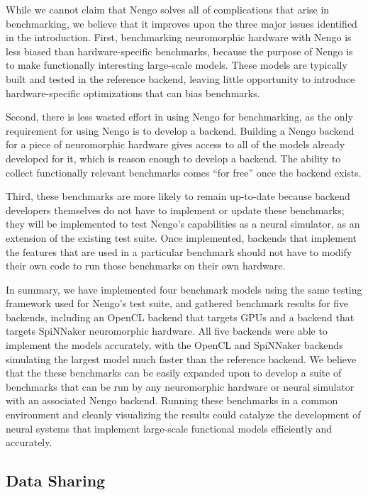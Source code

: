 \documentclass{frontiersSCNS}
\begin{document}
While we cannot claim that Nengo
solves all of complications that arise
in benchmarking,
we believe that it improves upon
the three major issues identified in the introduction.
First, benchmarking neuromorphic hardware
with Nengo is less biased than
hardware-specific benchmarks,
because the purpose of Nengo is
to make functionally interesting large-scale models.
These models are typically built and tested
in the reference backend,
leaving little opportunity to introduce
hardware-specific optimizations
that can bias benchmarks.

Second, there is less wasted effort
in using Nengo for benchmarking,
as the only requirement for using
Nengo is to develop a backend.
Building a Nengo backend for
a piece of neuromorphic hardware
gives access to all of the models
already developed for it,
which is reason enough to develop a backend.
The ability to collect functionally relevant benchmarks
comes ``for free'' once the backend exists.

Third, these benchmarks are more likely to
remain up-to-date because backend developers
themselves do not have to implement or update
these benchmarks;
they will be implemented to test Nengo's
capabilities as a neural simulator,
as an extension of the existing test suite.
Once implemented, backends that implement
the features that are used in a particular benchmark
should not have to modify their own code
to run those benchmarks on their own hardware.

In summary, we have implemented
four benchmark models using the same
testing framework used for Nengo's test suite,
and gathered benchmark results
for five backends,
including an OpenCL backend that targets GPUs
and a backend that targets
SpiNNaker neuromorphic hardware.
All five backends were able to implement
the models accurately,
with the OpenCL and SpiNNaker backends
simulating the largest model much faster
than the reference backend.
We believe that the these benchmarks
can be easily expanded upon
to develop a suite of benchmarks
that can be run by any neuromorphic hardware
or neural simulator
with an associated Nengo backend.
Running these benchmarks in a common environment
and cleanly visualizing the results
could catalyze the development of
neural systems that implement
large-scale functional models
efficiently and accurately.

\subsection{Data Sharing}
\end{document}
